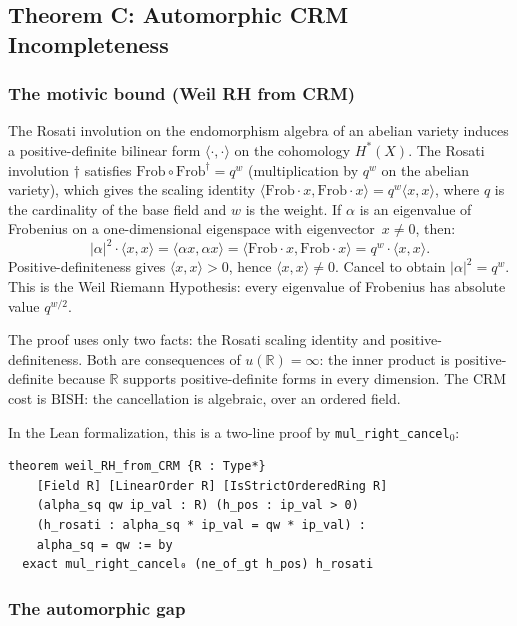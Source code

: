 \documentclass[11pt]{article}
\theoremstyle{definition}
\theoremstyle{remark}
\newcommand{\R}{\mathbb{R}}
\newcommand{\Frob}{\mathrm{Frob}}
\newcommand{\BISH}{\mathrm{BISH}}
\begin{document}
\subsection{Theorem C: Automorphic CRM Incompleteness}

\subsubsection{The motivic bound (Weil RH from CRM)}

The Rosati involution on the endomorphism algebra of an abelian variety induces a positive-definite bilinear form $\langle \cdot, \cdot \rangle$ on the cohomology $H^*(X)$. The Rosati involution $\dagger$ satisfies $\Frob \circ \Frob^\dagger = q^w$ (multiplication by $q^w$ on the abelian variety), which gives the scaling identity $\langle \Frob \cdot x, \Frob \cdot x \rangle = q^w \langle x, x \rangle$, where $q$ is the cardinality of the base field and $w$ is the weight. If $\alpha$ is an eigenvalue of Frobenius on a one-dimensional eigenspace with eigenvector~$x \neq 0$, then:
\[
  |\alpha|^2 \cdot \langle x, x \rangle = \langle \alpha x, \alpha x \rangle = \langle \Frob \cdot x, \Frob \cdot x \rangle = q^w \cdot \langle x, x \rangle.
\]
Positive-definiteness gives $\langle x, x \rangle > 0$, hence $\langle x, x \rangle \neq 0$. Cancel to obtain $|\alpha|^2 = q^w$. This is the Weil Riemann Hypothesis: every eigenvalue of Frobenius has absolute value $q^{w/2}$.

The proof uses only two facts: the Rosati scaling identity and positive-definiteness. Both are consequences of $u(\R) = \infty$: the inner product is positive-definite because $\R$ supports positive-definite forms in every dimension. The CRM cost is $\BISH$: the cancellation is algebraic, over an ordered field.

In the Lean formalization, this is a two-line proof by \texttt{mul\_right\_cancel$_0$}:
\begin{lstlisting}
theorem weil_RH_from_CRM {R : Type*}
    [Field R] [LinearOrder R] [IsStrictOrderedRing R]
    (alpha_sq qw ip_val : R) (h_pos : ip_val > 0)
    (h_rosati : alpha_sq * ip_val = qw * ip_val) :
    alpha_sq = qw := by
  exact mul_right_cancel₀ (ne_of_gt h_pos) h_rosati
\end{lstlisting}

\subsubsection{The automorphic gap}
\end{document}
